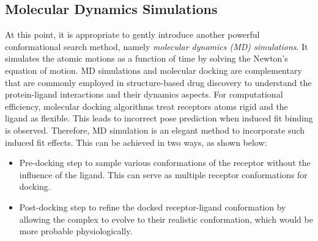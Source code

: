 \subsection*{Molecular Dynamics Simulations}
At this point, it is appropriate to gently introduce another powerful conformational search method, namely \textit{molecular dynamics (MD) simulations}. It simulates the atomic motions as a function of time by solving the Newton's equation of motion\cite{bib24}. 
MD simulations and molecular docking are complementary\cite{bib25, bib26} that are commonly employed in structure-based drug discovery to understand the protein-ligand interactions and their dynamics aspects. For computational efficiency, molecular docking algorithms treat receptors atoms rigid and the ligand as flexible. This leads to incorrect pose prediction when induced fit binding is observed. Therefore, MD simulation is an elegant method to incorporate such induced fit effects. This can be achieved in two ways, as shown below:
\begin{itemize}
\item Pre-docking step to sample various conformations of the receptor without the influence of the ligand.  This can serve as multiple receptor conformations for docking. 
\item Post-docking step to refine the docked receptor-ligand conformation by allowing the complex to evolve to their realistic conformation, which would be more probable physiologically.
\end{itemize}
